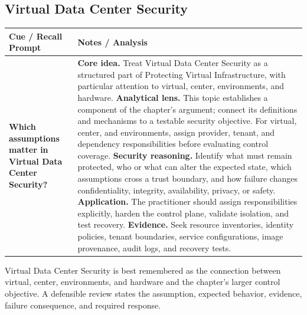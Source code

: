 \documentclass[11pt]{article}
\newcommand{\CornellHeader}{%
\rowcolor{Navy}\color{white}\bfseries Cue / Recall Prompt & \color{white}\bfseries Notes / Analysis\\\hline}
\newcommand{\CornellRow}[2]{%
\cellcolor{CueGray}\RaggedRight\textbf{#1} & \RaggedRight #2\\\hline}
\begin{document}
\subsection*{Virtual Data Center Security}
\begin{longtable}{>{\RaggedRight\arraybackslash}p{}|>{\RaggedRight\arraybackslash}p{}}
\CornellHeader
\CornellRow{Which assumptions matter in Virtual Data Center Security?}{\textbf{Core idea.} Treat Virtual Data Center Security as a structured part of Protecting Virtual Infrastructure, with particular attention to virtual, center, environments, and hardware. \textbf{Analytical lens.} This topic establishes a component of the chapter's argument; connect its definitions and mechanisms to a testable security objective. For virtual, center, and environments, assign provider, tenant, and dependency responsibilities before evaluating control coverage. \textbf{Security reasoning.} Identify what must remain protected, who or what can alter the expected state, which assumptions cross a trust boundary, and how failure changes confidentiality, integrity, availability, privacy, or safety. \textbf{Application.} The practitioner should assign responsibilities explicitly, harden the control plane, validate isolation, and test recovery. \textbf{Evidence.} Seek resource inventories, identity policies, tenant boundaries, service configurations, image provenance, audit logs, and recovery tests.}
\end{longtable}
\begin{topicsummary}
Virtual Data Center Security is best remembered as the connection between virtual, center, environments, and hardware and the chapter's larger control objective. A defensible review states the assumption, expected behavior, evidence, failure consequence, and required response.
\end{topicsummary}
\end{document}
